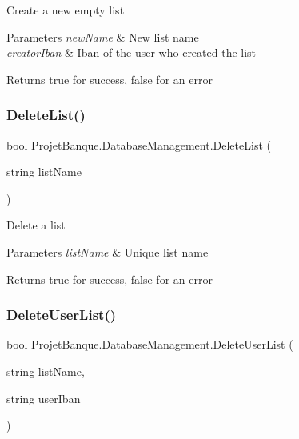 Create a new empty list 


\begin{DoxyParams}{Parameters}
{\em new\+Name} & New list name\\
\hline
{\em creator\+Iban} & Iban of the user who created the list\\
\hline
\end{DoxyParams}
\begin{DoxyReturn}{Returns}
true for success, false for an error
\end{DoxyReturn}
\mbox{\label{class_projet_banque_1_1_database_management_aaeebc8afb1a9c9e654d27ceb1719a740}} 
\subsubsection{\texorpdfstring{DeleteList()}{DeleteList()}}
{\footnotesize\ttfamily bool Projet\+Banque.\+Database\+Management.\+Delete\+List (\begin{DoxyParamCaption}\item[{string}]{list\+Name }\end{DoxyParamCaption})}



Delete a list 


\begin{DoxyParams}{Parameters}
{\em list\+Name} & Unique list name\\
\hline
\end{DoxyParams}
\begin{DoxyReturn}{Returns}
true for success, false for an error
\end{DoxyReturn}
\mbox{\label{class_projet_banque_1_1_database_management_aeb7e315638bb410c4a269cac784eee76}} 
\subsubsection{\texorpdfstring{DeleteUserList()}{DeleteUserList()}}
{\footnotesize\ttfamily bool Projet\+Banque.\+Database\+Management.\+Delete\+User\+List (\begin{DoxyParamCaption}\item[{string}]{list\+Name,  }\item[{string}]{user\+Iban }\end{DoxyParamCaption})}



